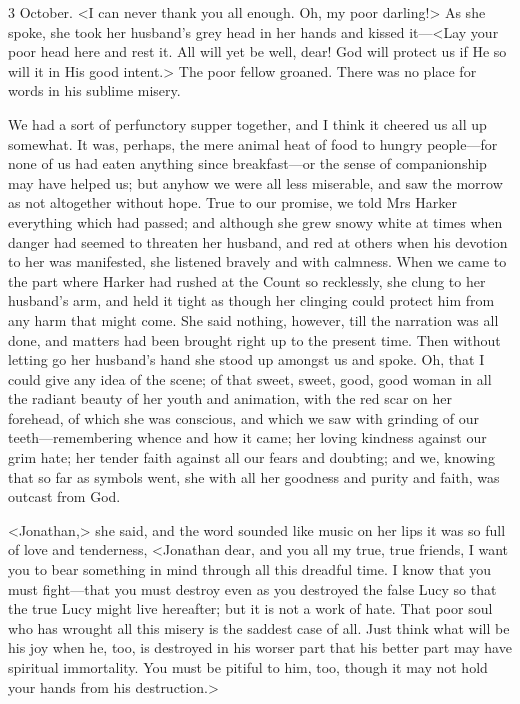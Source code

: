 \begin{diary}{3 October.}
<I can never thank you all enough. Oh, my poor darling!> As she spoke, she took her husband's grey head in her hands and kissed it—<Lay your poor head here and rest it. All will yet be well, dear! God will protect us if He so will it in His good intent.> The poor fellow groaned. There was no place for words in his sublime misery.

We had a sort of perfunctory supper together, and I think it cheered us all up somewhat. It was, perhaps, the mere animal heat of food to hungry people—for none of us had eaten anything since breakfast—or the sense of companionship may have helped us; but anyhow we were all less miserable, and saw the morrow as not altogether without hope. True to our promise, we told Mrs Harker everything which had passed; and although she grew snowy white at times when danger had seemed to threaten her husband, and red at others when his devotion to her was manifested, she listened bravely and with calmness. When we came to the part where Harker had rushed at the Count so recklessly, she clung to her husband's arm, and held it tight as though her clinging could protect him from any harm that might come. She said nothing, however, till the narration was all done, and matters had been brought right up to the present time. Then without letting go her husband's hand she stood up amongst us and spoke. Oh, that I could give any idea of the scene; of that sweet, sweet, good, good woman in all the radiant beauty of her youth and animation, with the red scar on her forehead, of which she was conscious, and which we saw with grinding of our teeth—remembering whence and how it came; her loving kindness against our grim hate; her tender faith against all our fears and doubting; and we, knowing that so far as symbols went, she with all her goodness and purity and faith, was outcast from God.

<Jonathan,> she said, and the word sounded like music on her lips it was so full of love and tenderness, <Jonathan dear, and you all my true, true friends, I want you to bear something in mind through all this dreadful time. I know that you must fight—that you must destroy even as you destroyed the false Lucy so that the true Lucy might live hereafter; but it is not a work of hate. That poor soul who has wrought all this misery is the saddest case of all. Just think what will be his joy when he, too, is destroyed in his worser part that his better part may have spiritual immortality. You must be pitiful to him, too, though it may not hold your hands from his destruction.>


\end{diary}
